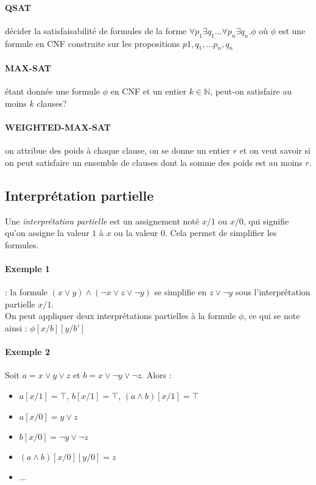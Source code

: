 \documentclass[a4paper]{article}
\begin{document}
    \paragraph{QSAT} 
    décider la satisfaisabilité de formules de la forme $\forall p_1 \exists q_1 ... \forall p_n \exists q_n.\phi$
    où $\phi$ est une formule en CNF construite sur les propositions $p1, q_1, ... p_n, q_n$

    \paragraph{MAX-SAT} étant donnée une formule $\phi$ en CNF et un entier $k \in \mathbb{N}$, 
    peut-on satisfaire au moins $k$ clauses?

    \paragraph{WEIGHTED-MAX-SAT} on attribue des poids à chaque clause, on se donne
    un entier $r$ et on veut savoir si on peut satisfaire un ensemble de clauses dont la 
    somme des poids est au moins $r$.

  \subsection{Interprétation partielle}
  Une \textit{interprétation partielle} est un assignement noté $x/1$ ou $x/0$, 
  qui signifie qu'on assigne la valeur $1$ à $x$ ou la valeur $0$. Cela permet
  de simplifier les formules. 

    \paragraph{Exemple 1} : la formule $(x \lor y) \land (\lnot x \lor z \lor \lnot y)$ se simplifie
    en $z \lor \lnot y $ sous l'interprétation partielle $x/1$.\\

  On peut appliquer deux interprétations partielles à la formule $\phi$, ce qui se
  note ainsi : $\phi[x/b][y/b']$

    \paragraph{Exemple 2} Soit $a = x \lor y \lor z$ et $b = x \lor \lnot y \lor \lnot z$. Alors :
    \begin{itemize}
      \item $a[x/1] = \top$, $b[x/1] = \top$, $(a \land b)[x/1] = \top$
      \item $a[x/0] = y \lor z$
      \item $b[x/0] = \lnot y \lor \lnot z$
      \item $(a \land b)[x/0][y/0] = z$
      \item ...
    \end{itemize}
\end{document}
